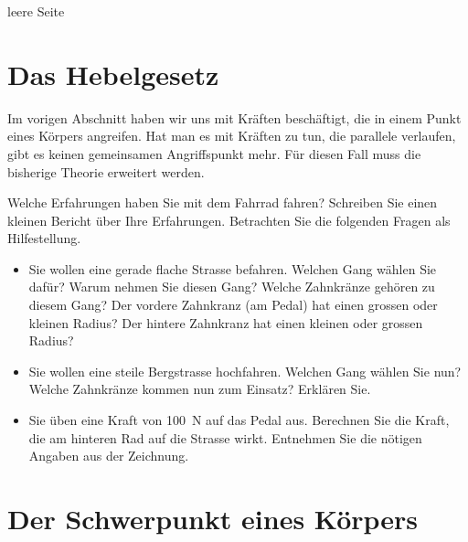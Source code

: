 \documentclass[12pt,a4paper,twoside]{article}
\def\dir{./Aufgaben_Mechanik/}
\newcommand{\Einbinden}[1]{}
\begin{document}
\newpage
leere Seite
\newpage
\section*{Das Hebelgesetz}
Im vorigen Abschnitt haben wir uns mit Kräften beschäftigt, die in einem Punkt eines Körpers angreifen.
Hat man es mit Kräften zu tun, die parallele verlaufen, gibt es keinen gemeinsamen Angriffspunkt mehr. 
Für diesen Fall muss die bisherige Theorie erweitert werden.

\Einbinden{\dir/drehmomente01.tex}
\Einbinden{\dir/drehmomente03.tex}%
\Einbinden{\dir/drehmomente05.tex}%
\Einbinden{\dir/drehmomente02.tex}%
\Einbinden{\dir/drehmomente04.tex}%

\Einbinden{\dir/drehmomente06.tex}
\Einbinden{\dir/drehmomente07.tex}


\begin{aufgabe}
	Welche Erfahrungen haben Sie mit dem Fahrrad fahren? Schreiben Sie einen kleinen Bericht über Ihre Erfahrungen.
	Betrachten Sie die folgenden Fragen als Hilfestellung.
	\begin{itemize}
		\item	Sie wollen eine gerade flache Strasse befahren. Welchen Gang wählen Sie dafür? Warum nehmen Sie diesen Gang?
		Welche Zahnkränze gehören zu diesem Gang? Der vordere Zahnkranz (am Pedal) hat einen grossen oder kleinen Radius?
		Der hintere Zahnkranz hat einen kleinen oder grossen Radius?

		\item Sie wollen eine steile Bergstrasse hochfahren. Welchen Gang wählen Sie nun? Welche Zahnkränze kommen nun zum Einsatz?
			Erklären Sie.

		\item Sie üben eine Kraft von \SI{100}{N} auf das Pedal aus.
			Berechnen Sie die Kraft, die am hinteren Rad auf die Strasse wirkt. Entnehmen Sie die nötigen Angaben aus der Zeichnung.
	
	\end{itemize}


	\begin{center}
	\end{center}

\end{aufgabe}




\section*{Der Schwerpunkt eines Körpers}
\Einbinden{\dir/schwerpunkt01.tex}%
\Einbinden{\dir/schwerpunkt02.tex}%
\end{document}
